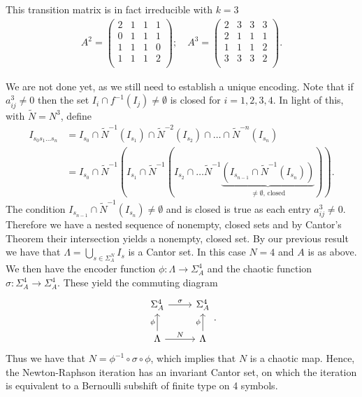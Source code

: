 This transition matrix is in fact irreducible with $k=3$
\begin{align}
	A^2 = 
	\begin{pmatrix}
		2 & 1 & 1 & 1 \\
		0 & 1 & 1 & 1 \\
		1 & 1 & 1 & 0 \\
		1 & 1 & 1 & 2 \\
	\end{pmatrix}
;\quad	
	A^3 = 
	\begin{pmatrix}
		2 & 3 & 3 & 3 \\
		2 & 1 & 1 & 1 \\
		1 & 1 & 1 & 2 \\
		3 & 3 & 3 & 2 \\
	\end{pmatrix}
	.
\end{align}

We are not done yet, as we still need to establish a unique encoding. Note that if $a^{3}_{ij}\neq 0$ then the set $I_{i}\cap f^{-1}(I_j)\neq \emptyset$ is closed for $i=1,2,3,4$. In light of this, with $\tilde{N}=N^3$, define
\begin{subequations}
\begin{align}
	I_{s_0s_1 \ldots s_n} &= I_{s_0} \cap \tilde{N}^{-1}(I_{s_1}) \cap \tilde{N}^{-2}(I_{s_2}) \cap \ldots \cap \tilde{N}^{-n}(I_{s_n}) \\
			      &= I_{s_0} \cap \tilde{N}^{-1}\left(I_{s_1} \cap \tilde{N}^{-1}\left( I_{s_2} \cap \ldots \tilde{N}^{-1}\underbrace{\left(I_{s_{n-1}}\cap \tilde{N}^{-1}(I_{s_n})\right) }_{\neq\emptyset \textrm{, closed} }\right) \right).
\end{align}
\end{subequations}
The condition $I_{s_{n-1}}\cap \tilde{N}^{-1}(I_{s_n})\neq \emptyset$ and is closed is true as each entry $a^{3}_{ij}\neq 0$. Therefore we have a nested sequence of nonempty, closed sets and by Cantor's Theorem their intersection yields a nonempty, closed set. By our previous result we have that $\Lambda= \bigcup_{s\in \Sigma^{N}_{A}}I_{s}$ is a Cantor set. In this case $N=4$ and $A$ is as above. We then have the encoder function $\phi:\Lambda \to \Sigma_{A}^{4}$ and the chaotic function $\sigma:\Sigma_{A}^{4}\to \Sigma_{A}^{4}$. These yield the commuting diagram
\begin{equation}
\begin{tikzcd}
	\Sigma_{A}^{4} \arrow[r, "\sigma"] 
& \Sigma_{A}^{4} \\
\Lambda \arrow[u,"\phi"] \arrow[r, "N"]
& \Lambda \arrow[u, "\phi"] 
\end{tikzcd}.
\end{equation}
Thus we have that $N=\phi^{-1}\circ \sigma \circ \phi$, which implies that $N$ is a chaotic map. Hence, the Newton-Raphson iteration has an invariant Cantor set, on which the iteration is equivalent to a Bernoulli subshift of finite type on 4 symbols.
